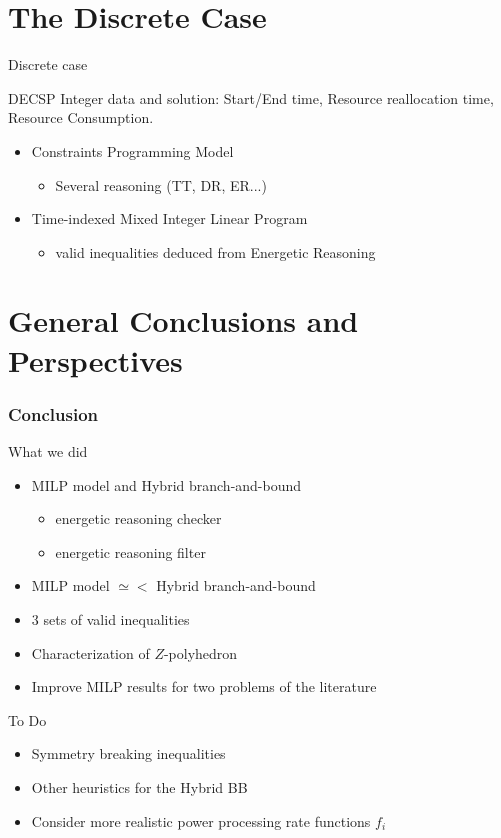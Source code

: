 \documentclass{beamer}
\begin{document}
\section{The Discrete Case}
\begin{frame}{Discrete case}
  \vfill
  \begin{block}{DECSP}
    Integer data and solution: Start/End time, Resource reallocation
    time, Resource Consumption.
  \end{block}
  \vfill
  \begin{itemize}
  \item Constraints Programming Model
    \begin{itemize}
    \item Several reasoning (TT, DR, ER...)
    \end{itemize}
    \vfill
  \item Time-indexed Mixed Integer Linear Program
    \begin{itemize}
    \item valid inequalities deduced from Energetic Reasoning
    \end{itemize}
  \end{itemize}
\vfill
\end{frame}
\section{General Conclusions and Perspectives}

\begin{frame}
\frametitle{Conclusion}
\vfill
  \begin{block}{What we did}
    \begin{itemize}
    \item MILP model and Hybrid branch-and-bound
      \vspace{0.2cm}
      \begin{itemize}
      \item energetic reasoning checker
      \item energetic reasoning filter
      \end{itemize}
    \item MILP model $\simeq<$ Hybrid branch-and-bound
    \item 3 sets of valid inequalities
    \item Characterization of $Z$-polyhedron
    \item Improve MILP results for two problems of the literature 
    \end{itemize}
  \end{block}
  \vfill
  \begin{block}{To Do}
    \begin{itemize}
    \item Symmetry breaking inequalities 
      \vspace{0.3cm}
    \item Other heuristics for the Hybrid BB 
      \vspace{0.3cm}
    \item Consider more realistic power processing rate functions $f_i$
    \end{itemize}
  \end{block}
  \vfill
\end{frame}
\end{document}
